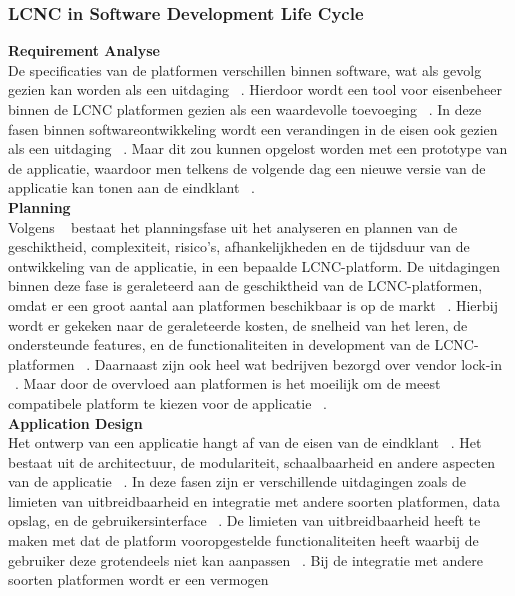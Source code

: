\subsubsection*{LCNC in Software Development Life Cycle}
\label{subsec:lcnc-binnen-agile}
\textbf{Requirement Analyse}
\\
De specificaties van de platformen verschillen binnen software, wat als gevolg gezien kan worden als een
uitdaging ~\autocite{Rokis_2022}. Hierdoor wordt een tool voor eisenbeheer binnen de LCNC platformen
gezien als een waardevolle toevoeging ~\autocite{Rokis_2022}. In deze fasen binnen softwareontwikkeling wordt een verandingen in de eisen
ook gezien als een uitdaging ~\autocite{Rokis_2022}.  Maar  dit zou kunnen opgelost worden met een prototype van de applicatie,
waardoor men telkens de volgende dag een nieuwe versie van de applicatie kan tonen aan de eindklant ~\autocite{Rokis_2022}.
\\
\textbf{Planning}
\\
Volgens ~\textcite{Rokis_2022} bestaat het planningsfase uit het analyseren en plannen van de geschiktheid, complexiteit, risico's, afhankelijkheden en de tijdsduur van de ontwikkeling van de applicatie, in een bepaalde LCNC-platform.
De uitdagingen binnen deze fase is geraleteerd aan de geschiktheid van de LCNC-platformen, omdat er een groot aantal aan platformen beschikbaar is op de markt ~\autocite{Rokis_2022}.
Hierbij wordt er gekeken naar de geraleteerde kosten, de snelheid van het leren, de ondersteunde features, en de functionaliteiten in development van de LCNC-platformen ~\autocite{Rokis_2022}.
Daarnaast zijn ook heel wat bedrijven bezorgd over vendor lock-in ~\autocite{Rokis_2022}.
Maar door de overvloed aan platformen is het moeilijk om de meest compatibele platform te kiezen voor de applicatie ~\autocite{Rokis_2022}.
\\
\textbf{Application Design}
\\
Het ontwerp van een applicatie hangt af van de eisen van de eindklant ~\autocite{Rokis_2022}. Het bestaat uit de architectuur, de modulariteit, schaalbaarheid en andere aspecten van de applicatie ~\autocite{Rokis_2022}.
In deze fasen zijn er verschillende uitdagingen zoals de limieten van uitbreidbaarheid en integratie met andere soorten platformen, data opslag, en de gebruikersinterface ~\autocite{Rokis_2022}.
De limieten van uitbreidbaarheid heeft te maken met dat de platform vooropgestelde functionaliteiten heeft waarbij de gebruiker deze grotendeels niet kan aanpassen ~\autocite{Rokis_2022}. Bij de integratie met andere soorten platformen wordt er een vermogen

